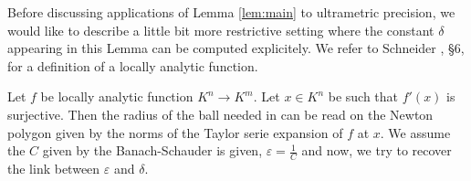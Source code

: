\documentclass{amsart}
\begin{document}

Before discussing applications of Lemma \ref{lem:main} to ultrametric 
precision, we would like to describe a little bit more restrictive 
setting where the constant $\delta$ appearing in this Lemma can be 
computed explicitely.
We refer to Schneider \cite{Schneider}, \S 6, for a definition of a 
locally analytic function.

\begin{rmk}
Let $f$ be locally analytic function $K^n \rightarrow K^m$. Let $x \in K^n$ be such that $f'(x)$ is surjective. Then the radius of the ball needed in can be read on the Newton polygon given by the norms of the Taylor serie expansion of $f$ at $x$. We assume the $C$ given by the Banach-Schauder is given, $\varepsilon = \frac{1}{C}$ and now, we try to recover the link between $\varepsilon$ and $\delta$.
\end{rmk}
\end{document}
